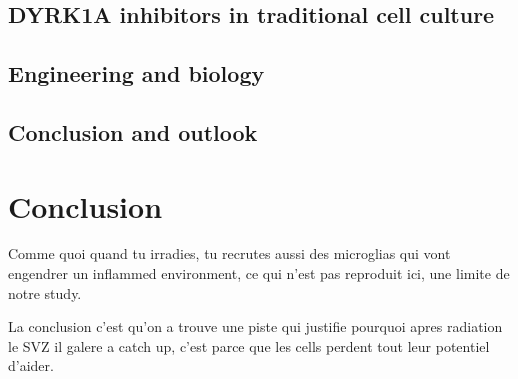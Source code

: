 \documentclass[onecolumn,10pt]{asme2ej}
\begin{document}
\subsection{DYRK1A inhibitors in traditional cell culture}
\subsection{Engineering and biology}
\subsection{Conclusion and outlook}

\section{Conclusion}


Comme quoi quand tu irradies, tu recrutes aussi des microglias qui vont engendrer un inflammed environment, ce qui n'est pas reproduit ici, une limite de notre study. 

La conclusion c'est qu'on a trouve une piste qui justifie pourquoi apres radiation le SVZ il galere a catch up, c'est parce que les cells perdent tout leur potentiel d'aider. 







\end{document}
